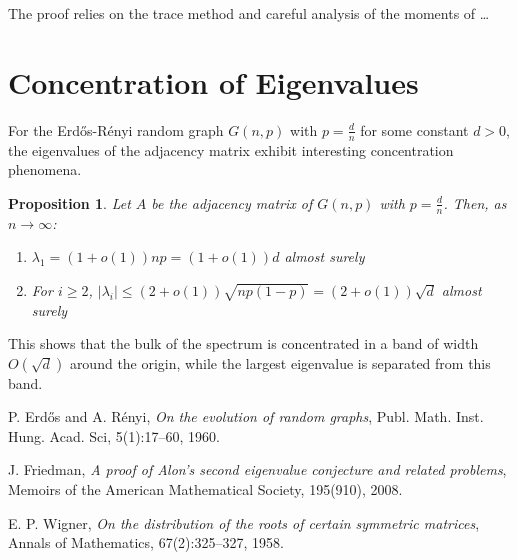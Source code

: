 \documentclass[12pt,a4paper]{article}
\newtheorem{proposition}[theorem]{Proposition}
\begin{document}
The proof relies on the trace method and careful analysis of the moments of \dots

\section{Concentration of Eigenvalues}
For the Erdős-Rényi random graph $G(n,p)$ with $p = \frac{d}{n}$ for some constant $d > 0$, the eigenvalues of the adjacency matrix exhibit interesting concentration phenomena.

\begin{proposition}
    Let $A$ be the adjacency matrix of $G(n,p)$ with $p = \frac{d}{n}$. Then, as $n \to \infty$:
    \begin{enumerate}
        \item $\lambda_1 = (1+o(1))np = (1+o(1))d$ almost surely
        \item For $i \ge 2$, $|\lambda_i| \leq (2+o(1))\sqrt{np(1-p)} = (2+o(1))\sqrt{d}$ almost surely
    \end{enumerate}
\end{proposition}

This shows that the bulk of the spectrum is concentrated in a band of width $O(\sqrt{d})$ around the origin, while the largest eigenvalue is separated from this band.




\begin{thebibliography}{9}
    P. Erdős and A. Rényi,
    \textit{On the evolution of random graphs},
    Publ. Math. Inst. Hung. Acad. Sci, 5(1):17--60, 1960.

    J. Friedman,
    \textit{A proof of Alon's second eigenvalue conjecture and related problems},
    Memoirs of the American Mathematical Society, 195(910), 2008.

    E. P. Wigner,
    \textit{On the distribution of the roots of certain symmetric matrices},
    Annals of Mathematics, 67(2):325--327, 1958.


\end{thebibliography}
\end{document}
